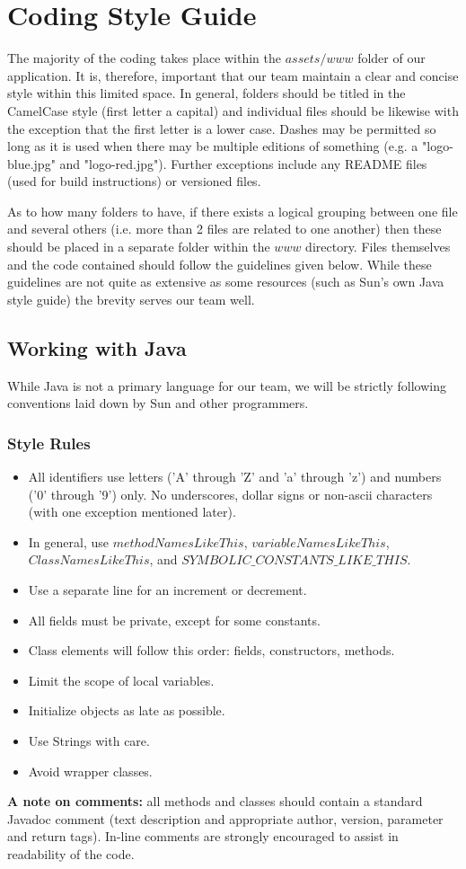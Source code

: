 \documentclass[12pt]{article}
\begin{document}
\section{Coding Style Guide}
The majority of the coding takes place within the $assets/www$ folder of our application.  It is, therefore, important that our team maintain a clear and concise style within this limited space.  In general, folders should be titled in the CamelCase style (first letter a capital) and individual files should be likewise with the exception that the first letter is a lower case.  Dashes may be permitted so long as it is used when there may be multiple editions of something (e.g. a "logo-blue.jpg" and "logo-red.jpg").  Further exceptions include any README files (used for build instructions) or versioned files.  

As to how many folders to have, if there exists a logical grouping between one file and several others (i.e. more than 2 files are related to one another) then these should be placed in a separate folder within the $www$ directory.  Files themselves and the code contained should follow the guidelines given below.  While these guidelines are not quite as extensive as some resources (such as Sun's own Java style guide\cite{JavaStyle-Sun}) the brevity serves our team well.

\subsection{Working with Java}
While Java is not a primary language for our team, we will be strictly following conventions laid down by Sun and other programmers\cite{JavaStyle-Sun}\cite{JavaStyle-JavaRanch}.

\subsubsection{Style Rules}
\begin{itemize}
\item All identifiers use letters ('A' through 'Z' and 'a' through 'z') and numbers ('0' through '9') only. No underscores, dollar signs or non-ascii characters (with one exception mentioned later).
\item In general, use $methodNamesLikeThis$, $variableNamesLikeThis$, $ClassNamesLikeThis$, and $SYMBOLIC\_CONSTANTS\_LIKE\_THIS$.
\item Use a separate line for an increment or decrement.
\item All fields must be private, except for some constants.
\item Class elements will follow this order: fields, constructors, methods. 
\item Limit the scope of local variables.
\item Initialize objects as late as possible.
\item Use Strings with care.
\item Avoid wrapper classes.
\end{itemize}
\textbf{A note on comments:} all methods and classes should contain a standard Javadoc comment (text description and appropriate author, version, parameter and return tags).  In-line comments are strongly encouraged to assist in readability of the code.
\end{document}
